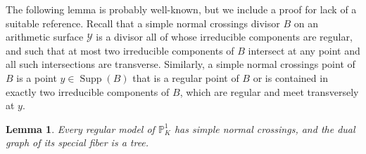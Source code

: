 \documentclass[12pt]{amsart}
\numberwithin{equation}{section}
\newtheorem{lemma}[equation]{Lemma}
\theoremstyle{definition}
\newcommand{\mc}[1]{\mathcal{#1}}
\renewcommand{\P}{\mathbb P}
\newcommand{\proj}{\mathbb P}
\newcommand{\Y}{\mathcal{Y}}
\DeclareMathOperator{\Supp}{Supp}
\begin{document}

The following lemma is probably well-known, but we include a proof for
lack of a suitable reference. 
Recall that a simple normal crossings divisor $B$ on an arithmetic surface $\Y$ is a divisor all of
whose irreducible components are regular, and such that at most two irreducible
components of $B$ intersect at any point and all such intersections
are transverse. Similarly, a simple normal crossings point of $B$ is a point $y\in \Supp(B)$ that is a regular point of $B$ or is contained in exactly two irreducible components of $B$, which are regular and meet transversely at $y$. 


\begin{lemma}\label{Lnormalcrossings}
Every regular model of $\proj^1_K$ has simple normal crossings, and the dual graph of its special fiber is a tree.   
\end{lemma}
\end{document}
